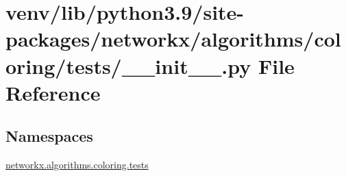 \hypertarget{venv_2lib_2python3_89_2site-packages_2networkx_2algorithms_2coloring_2tests_2____init_____8py}{}\section{venv/lib/python3.9/site-\/packages/networkx/algorithms/coloring/tests/\+\_\+\+\_\+init\+\_\+\+\_\+.py File Reference}
\label{venv_2lib_2python3_89_2site-packages_2networkx_2algorithms_2coloring_2tests_2____init_____8py}
\subsection*{Namespaces}
\begin{DoxyCompactItemize}
\item 
 \hyperlink{namespacenetworkx_1_1algorithms_1_1coloring_1_1tests}{networkx.\+algorithms.\+coloring.\+tests}
\end{DoxyCompactItemize}
